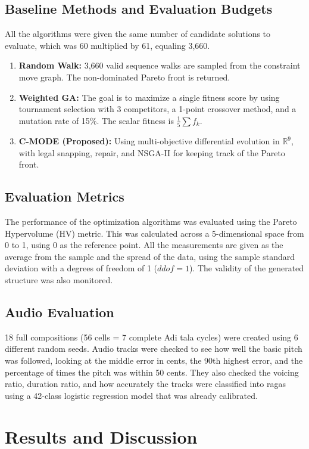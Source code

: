 \documentclass[conference,letterpaper]{IEEEtran}
\newcounter{algorithm}
\begin{document}
\subsection{Baseline Methods and Evaluation Budgets}
All the algorithms were given the same number of candidate solutions to evaluate, which was 60 multiplied by 61, equaling 3,660.
\begin{enumerate}
    \item \textbf{Random Walk:} 3,660 valid sequence walks are sampled from the constraint move graph. The non-dominated Pareto front is returned.
    \item \textbf{Weighted GA:} The goal is to maximize a single fitness score by using tournament selection with 3 competitors, a 1-point crossover method, and a mutation rate of 15\%. The scalar fitness is $\frac{1}{5}\sum f_k$.
    \item \textbf{C-MODE (Proposed):} Using multi-objective differential evolution in $\mathbb{R}^9$, with legal snapping, repair, and NSGA-II for keeping track of the Pareto front.
\end{enumerate}

\subsection{Evaluation Metrics}
The performance of the optimization algorithms was evaluated using the Pareto Hypervolume (HV) metric. This was calculated across a 5-dimensional space from 0 to 1, using 0 as the reference point. All the measurements are given as the average from the sample and the spread of the data, using the sample standard deviation with a degrees of freedom of 1 ($ddof=1$). The validity of the generated structure was also monitored.

\subsection{Audio Evaluation}
18 full compositions (56 cells = 7 complete Adi tala cycles) were created using 6 different random seeds. Audio tracks were checked to see how well the basic pitch was followed, looking at the middle error in cents, the 90th highest error, and the percentage of times the pitch was within 50 cents. They also checked the voicing ratio, duration ratio, and how accurately the tracks were classified into ragas using a 42-class logistic regression model that was already calibrated.

\section{Results and Discussion}
\end{document}
